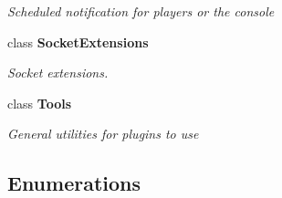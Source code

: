 \begin{DoxyCompactItemize}
\begin{DoxyCompactList}\small\item\em Scheduled notification for players or the console \end{DoxyCompactList}\item 
class {\bfseries Socket\+Extensions}
\begin{DoxyCompactList}\small\item\em Socket extensions. \end{DoxyCompactList}\item 
class {\bfseries Tools}
\begin{DoxyCompactList}\small\item\em General utilities for plugins to use \end{DoxyCompactList}\end{DoxyCompactItemize}
\subsection*{Enumerations}

